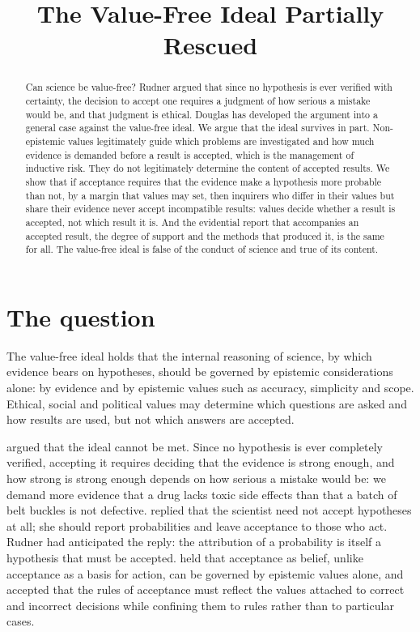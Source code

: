 \documentclass{situationist-preprint}
\title{The Value-Free Ideal Partially Rescued}
\begin{document}
\maketitle

\begin{abstract}
Can science be value-free? Rudner argued that since no hypothesis is ever verified with certainty, the decision to accept one requires a judgment of how serious a mistake would be, and that judgment is ethical. Douglas has developed the argument into a general case against the value-free ideal. We argue that the ideal survives in part. Non-epistemic values legitimately guide which problems are investigated and how much evidence is demanded before a result is accepted, which is the management of inductive risk. They do not legitimately determine the content of accepted results. We show that if acceptance requires that the evidence make a hypothesis more probable than not, by a margin that values may set, then inquirers who differ in their values but share their evidence never accept incompatible results: values decide whether a result is accepted, not which result it is. And the evidential report that accompanies an accepted result, the degree of support and the methods that produced it, is the same for all. The value-free ideal is false of the conduct of science and true of its content.
\end{abstract}

\section{The question}

The value-free ideal holds that the internal reasoning of science, by which evidence bears on hypotheses, should be governed by epistemic considerations alone: by evidence and by epistemic values such as accuracy, simplicity and scope. Ethical, social and political values may determine which questions are asked and how results are used, but not which answers are accepted.

\citet{Rudner1953} argued that the ideal cannot be met. Since no hypothesis is ever completely verified, accepting it requires deciding that the evidence is strong enough, and how strong is strong enough depends on how serious a mistake would be: we demand more evidence that a drug lacks toxic side effects than that a batch of belt buckles is not defective. \citet{Jeffrey1956} replied that the scientist need not accept hypotheses at all; she should report probabilities and leave acceptance to those who act. Rudner had anticipated the reply: the attribution of a probability is itself a hypothesis that must be accepted. \citet{Levi1960} held that acceptance as belief, unlike acceptance as a basis for action, can be governed by epistemic values alone, and \citet{Hempel1965} accepted that the rules of acceptance must reflect the values attached to correct and incorrect decisions while confining them to rules rather than to particular cases.
\end{document}
